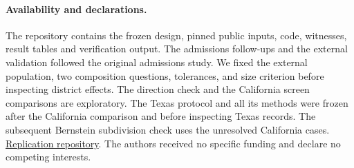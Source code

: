 \documentclass[11pt]{article}
\begin{document}
\paragraph{Availability and declarations.}
The repository contains the frozen design, pinned public inputs, code, witnesses, result tables and verification output. The admissions follow-ups and the external validation followed the original admissions study. We fixed the external population, two composition questions, tolerances, and size criterion before inspecting district effects. The direction check and the California screen comparisons are exploratory. The Texas protocol and all its methods were frozen after the California comparison and before inspecting Texas records. The subsequent Bernstein subdivision check uses the unresolved California cases. \href{https://github.com/fightforbelief/p7-shared-release-audit}{Replication repository}. The authors received no specific funding and declare no competing interests.
\end{document}

